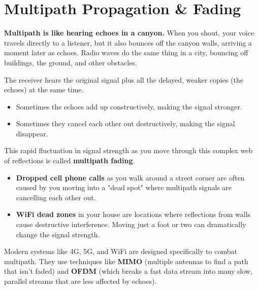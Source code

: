 
\chapter{Multipath Propagation \& Fading}
\label{ch:multipath}

\begin{nontechnical}
    \textbf{Multipath is like hearing echoes in a canyon.} When you shout, your voice travels directly to a listener, but it also bounces off the canyon walls, arriving a moment later as echoes. Radio waves do the same thing in a city, bouncing off buildings, the ground, and other obstacles.

     The receiver hears the original signal plus all the delayed, weaker copies (the echoes) at the same time.
    \begin{itemize}
        \item Sometimes the echoes add up constructively, making the signal stronger.
        \item Sometimes they cancel each other out destructively, making the signal disappear.
    \end{itemize}
    This rapid fluctuation in signal strength as you move through this complex web of reflections is called \textbf{multipath fading}.

    \begin{itemize}
        \item \textbf{Dropped cell phone calls} as you walk around a street corner are often caused by you moving into a "dead spot" where multipath signals are cancelling each other out.
        \item \textbf{WiFi dead zones} in your house are locations where reflections from walls cause destructive interference. Moving just a foot or two can dramatically change the signal strength.
    \end{itemize}

     Modern systems like 4G, 5G, and WiFi are designed specifically to combat multipath. They use techniques like \textbf{MIMO} (multiple antennas to find a path that isn't faded) and \textbf{OFDM} (which breaks a fast data stream into many slow, parallel streams that are less affected by echoes).
\end{nontechnical}


